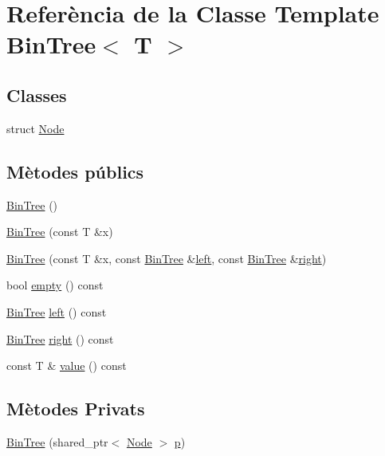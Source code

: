 \hypertarget{class_bin_tree}{}\section{Referència de la Classe Template Bin\+Tree$<$ T $>$}
\label{class_bin_tree}
\subsection*{Classes}
\begin{DoxyCompactItemize}
\item 
struct \hyperlink{struct_bin_tree_1_1_node}{Node}
\end{DoxyCompactItemize}
\subsection*{Mètodes públics}
\begin{DoxyCompactItemize}
\item 
\hyperlink{class_bin_tree_a47eef22d29cd023449d97c073c08e5b6}{Bin\+Tree} ()
\item 
\hyperlink{class_bin_tree_a1ab686e0bcf990093ff91fe71744c1a4}{Bin\+Tree} (const T \&x)
\item 
\hyperlink{class_bin_tree_adb7eeff76d08130c943b36af215eb521}{Bin\+Tree} (const T \&x, const \hyperlink{class_bin_tree}{Bin\+Tree} \&\hyperlink{class_bin_tree_a781025fb1c3693e91e851d55b181bedd}{left}, const \hyperlink{class_bin_tree}{Bin\+Tree} \&\hyperlink{class_bin_tree_a009c4bb95a25a1b639da637de32101ce}{right})
\item 
bool \hyperlink{class_bin_tree_a9ca8d7ae95b9bed51eb43f30c8d2bd58}{empty} () const 
\item 
\hyperlink{class_bin_tree}{Bin\+Tree} \hyperlink{class_bin_tree_a781025fb1c3693e91e851d55b181bedd}{left} () const 
\item 
\hyperlink{class_bin_tree}{Bin\+Tree} \hyperlink{class_bin_tree_a009c4bb95a25a1b639da637de32101ce}{right} () const 
\item 
const T \& \hyperlink{class_bin_tree_af545517333e94fdbfccfbc7df7d961fe}{value} () const 
\end{DoxyCompactItemize}
\subsection*{Mètodes Privats}
\begin{DoxyCompactItemize}
\item 
\hyperlink{class_bin_tree_a1408d37d1afda12d99747d09543c15f4}{Bin\+Tree} (shared\+\_\+ptr$<$ \hyperlink{struct_bin_tree_1_1_node}{Node} $>$ \hyperlink{class_bin_tree_afe3647af1dda90f6ddf1deee6560fcf1}{p})
\end{DoxyCompactItemize}

